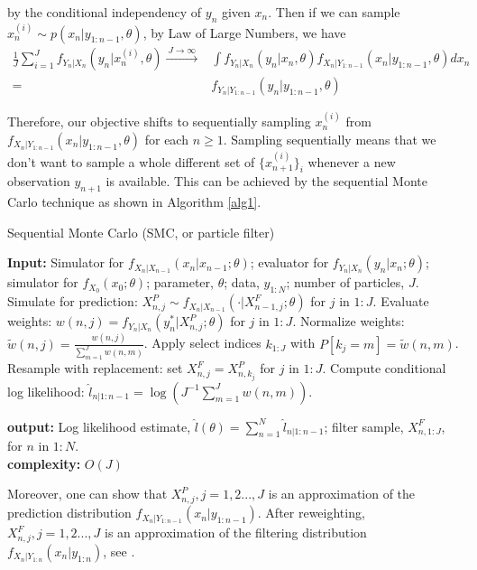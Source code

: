 \documentclass[10pt]{article}
\begin{document}
by the conditional independency of $y_n$ given $x_n$. Then if we can sample $x^{(i)}_n \sim p(x_n|y_{1:n-1}, \theta)$, by Law of Large Numbers, we have 
\vspace{-1mm}
\begin{align*}
\frac{1}{J}\sum_{i=1}^{J}f_{Y_n|X_{n}}(y_n|x^{(i)}_n,\theta) \xrightarrow{\: J \to \infty \: } &\int f_{Y_n|X_{n}}(y_n|x_n, \theta)f_{X_n|Y_{1:n-1}}(x_n|y_{1:n-1}, \theta)dx_n \\
= &f_{Y_n|Y_{1:n-1}}(y_n|y_{1:n-1}, \theta) 
\end{align*}
 
Therefore, our objective shifts to sequentially sampling $x_n^{(i)}$ from $f_{X_n|Y_{1:n-1}}(x_n|y_{1:n-1}, \theta)$ for each $n \geq 1$. Sampling sequentially means that we don't want to sample a whole different set of $\{x_{n+1}^{(i)}\}_i$ whenever a new observation $y_{n+1}$ is available. This can be achieved by the sequential Monte Carlo technique as shown in Algorithm \ref{alg1}.

\vspace{3mm}


\begin{algorithm}
\caption{Sequential Monte Carlo (SMC, or particle filter)}
\label{alg1}
\begin{algorithmic}[1]
\Statex \textbf{Input: }Simulator for $f_{X_n|X_{n-1}}(x_n | x_{n-1}; \theta)$; evaluator for $f_{Y_n|X_n}(y_n | x_n; \theta)$; simulator for $f_{X_0}(x_0;\theta)$; parameter, $\theta$; data, $y_{1:N}$; number of particles, $J$.
    \State Simulate for prediction: $X_{n,j}^P \sim f_{X_n|X_{n-1}}(\cdot | X_{n-1,j}^F;\theta)$ for $j$ in $1:J$.
    \State Evaluate weights: $w(n,j) = f_{Y_n|X_n}(y_n^*|X_{n,j}^P;\theta)$ for $j$ in $1:J$.
    \State Normalize weights: $\tilde{w}(n,j) = \frac{w(n,j)}{\sum_{m=1}^J w(n,m)}$.
    \State Apply select indices $k_{1:J}$ with $P[k_j = m] = \tilde{w}(n,m)$.
    \State Resample with replacement: set $X_{n,j}^F = X_{n,k_j}^P$ for $j$ in $1:J$.
    \State Compute conditional log likelihood: $\hat{l}_{n|1:n-1} = \log \left( J^{-1} \sum_{m=1}^J w(n,m) \right)$.
\EndFor
\end{algorithmic}
\textbf{output:} Log likelihood estimate, $\hat{l}(\theta) = \sum_{n=1}^N \hat{l}_{n|1:n-1}$; filter sample, $X_{n,1:J}^F$, for $n$ in $1:N$. \\
\textbf{complexity:} $O(J)$
\end{algorithm}

Moreover, one can show that $X_{n,j}^P, j=1,2...,J$ is an approximation of the prediction distribution $f_{X_{n}|Y_{1:n-1}}(x_{n}|y_{1:n-1})$. After reweighting, $X_{n,j}^F, j=1,2...,J$ is an approximation of the filtering distribution $f_{X_{n}|Y_{1:n}}(x_{n}|y_{1:n})$, see \cite{gordon1993, Smith1992-st}. 
\end{document}
